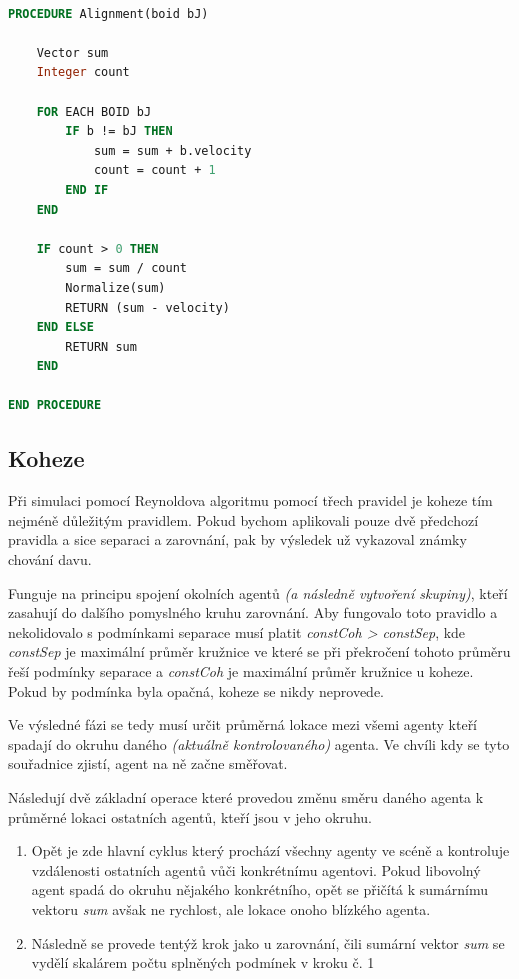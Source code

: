 \documentclass[czech,public,dept460,male,cpdeclaration]{diploma}
\begin{document}
\begin{lstlisting}[language=pascal,label=src:Alignment pseudocode,caption=Pseudokód pro zarovnání]

PROCEDURE Alignment(boid bJ)

	Vector sum
	Integer count
	
	FOR EACH BOID bJ
		IF b != bJ THEN
			sum = sum + b.velocity
			count = count + 1
		END IF
	END
	
	IF count > 0 THEN
		sum = sum / count
		Normalize(sum)
		RETURN (sum - velocity)
	END ELSE
		RETURN sum
	END

END PROCEDURE

\end{lstlisting}

\subsection{Koheze}
Při simulaci pomocí Reynoldova algoritmu pomocí třech pravidel je koheze tím nejméně důležitým pravidlem. Pokud bychom aplikovali pouze dvě předchozí pravidla a sice separaci a zarovnání, pak by výsledek už vykazoval známky chování davu.

Funguje na principu spojení okolních agentů \textit{(a následně vytvoření skupiny)}, kteří zasahují do dalšího pomyslného kruhu zarovnání. Aby fungovalo toto pravidlo a nekolidovalo s podmínkami separace musí platit \textit{constCoh > constSep}, kde \textit{constSep} je maximální průměr kružnice ve které se při překročení tohoto průměru řeší podmínky separace a \textit{constCoh} je maximální průměr kružnice u koheze. Pokud by podmínka byla opačná, koheze se nikdy neprovede.

Ve výsledné fázi se tedy musí určit průměrná lokace mezi všemi agenty kteří spadají do okruhu daného \textit{(aktuálně kontrolovaného)} agenta. Ve chvíli kdy se tyto souřadnice zjistí, agent na ně začne směřovat.

Následují dvě základní operace které provedou změnu směru daného agenta k průměrné lokaci ostatních agentů, kteří jsou v jeho okruhu.

\begin{enumerate}
	\item Opět je zde hlavní cyklus který prochází všechny agenty ve scéně a kontroluje vzdálenosti ostatních agentů vůči konkrétnímu agentovi. Pokud libovolný agent spadá do okruhu nějakého konkrétního, opět se přičítá k sumárnímu vektoru \textit{sum} avšak ne rychlost, ale lokace onoho blízkého agenta.
	\item Následně se provede tentýž krok jako u zarovnání, čili sumární vektor \textit{sum} se vydělí skalárem počtu splněných podmínek v kroku č. 1
	
\end{enumerate}
\end{document}
